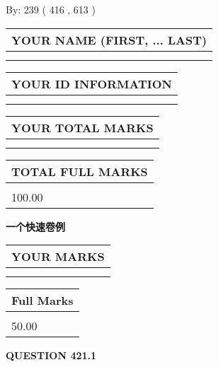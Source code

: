 \documentclass{ctexart}
\begin{document}
   
\hspace{1.0in} By: 
 239 ( 416 ,  613 )
   
   
   
   
\newpage 
\setcounter{page}{ 
   421001 } 
   
   
   
   
\noindent\begin{tabular}{|l|}
\hline
YOUR NAME (FIRST, ... LAST)  \\
\hline
 \\ 
 \\ 
\hline
\end{tabular}
\hspace{0.05in} \begin{tabular}{|l|}
\hline
 YOUR   ID   INFORMATION  \\
\hline
 \\ 
 \\ 
\hline
\end{tabular}
   
   
\vspace{0.2in}\noindent\begin{tabular}{|l|}
\hline
YOUR TOTAL MARKS  \\
\hline
 \\ 
 \\ 
\hline
\end{tabular}
\hspace{0.05in} \begin{tabular}{|l|}
\hline
TOTAL FULL MARKS  \\
\hline
 \\ 
100.00 \\
\hline
\end{tabular}
   
   
 \vspace{0.2in}
{\LARGE {\textbf{ 一个快速卷例}}}
   
   
  
\vspace{0.2in}
  
\noindent\begin{tabular}{|l|}
\hline
 YOUR MARKS  \\
\hline
 \\ 
 \\ 
\hline
\end{tabular}
\hspace{0.05in} \begin{tabular}{|l|}
\hline
 Full Marks  \\
\hline
 \\ 
50.00 \\
\hline
\end{tabular}
{\textbf{\Large{QUESTION
421.1 
}}}
  
\end{document}

